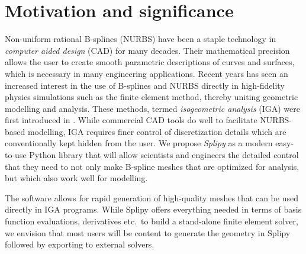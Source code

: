 \documentclass[preprint,12pt, a4paper]{elsarticle}
\begin{document}
\linenumbers


\section{Motivation and significance}
\label{sec:motivation}

Non-uniform rational B-splines (NURBS) have been a staple technology in \emph{computer aided design} (CAD) for many decades.
Their mathematical precision allows the user to create smooth parametric descriptions of curves and surfaces, which is necessary in many engineering applications.
Recent years has seen an increased interest in the use of B-splines and NURBS directly in high-fidelity physics simulations such as the finite element method, thereby uniting geometric modelling and analysis.
These methods, termed \emph{isogeometric analysis} (IGA) were first introduced in \cite{hughes2005iac}.
While commercial CAD tools do well to facilitate NURBS-based modelling, IGA requires finer control of discretization details which are conventionally kept hidden from the user.
We propose \emph{Splipy} as a modern easy-to-use Python library that will allow scientists and engineers the detailed control that they need to not only make B-spline meshes that are optimized for analysis, but which also work well for modelling.

The software allows for rapid generation of high-quality meshes that can be used directly in IGA programs.
While Splipy offers everything needed in terms of basis function evaluations, derivatives etc.~to build a stand-alone finite element solver, we envision that most users will be content to generate the geometry in Splipy followed by exporting to external solvers.

\end{document}
